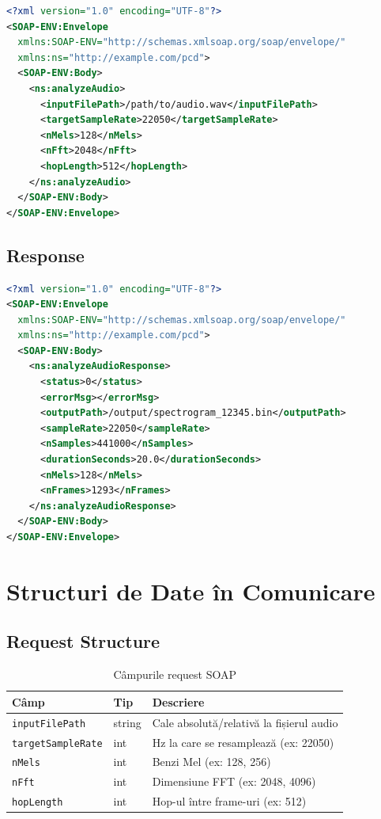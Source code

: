 \documentclass[12pt,a4paper,oneside]{book}
\begin{document}
\begin{lstlisting}[language=xml,caption=Exemplu SOAP Request]
<?xml version="1.0" encoding="UTF-8"?>
<SOAP-ENV:Envelope
  xmlns:SOAP-ENV="http://schemas.xmlsoap.org/soap/envelope/"
  xmlns:ns="http://example.com/pcd">
  <SOAP-ENV:Body>
    <ns:analyzeAudio>
      <inputFilePath>/path/to/audio.wav</inputFilePath>
      <targetSampleRate>22050</targetSampleRate>
      <nMels>128</nMels>
      <nFft>2048</nFft>
      <hopLength>512</hopLength>
    </ns:analyzeAudio>
  </SOAP-ENV:Body>
</SOAP-ENV:Envelope>
\end{lstlisting}

\subsection{Response}

\begin{lstlisting}[language=xml,caption=Exemplu SOAP Response]
<?xml version="1.0" encoding="UTF-8"?>
<SOAP-ENV:Envelope
  xmlns:SOAP-ENV="http://schemas.xmlsoap.org/soap/envelope/"
  xmlns:ns="http://example.com/pcd">
  <SOAP-ENV:Body>
    <ns:analyzeAudioResponse>
      <status>0</status>
      <errorMsg></errorMsg>
      <outputPath>/output/spectrogram_12345.bin</outputPath>
      <sampleRate>22050</sampleRate>
      <nSamples>441000</nSamples>
      <durationSeconds>20.0</durationSeconds>
      <nMels>128</nMels>
      <nFrames>1293</nFrames>
    </ns:analyzeAudioResponse>
  </SOAP-ENV:Body>
</SOAP-ENV:Envelope>
\end{lstlisting}

\section{Structuri de Date în Comunicare}

\subsection{Request Structure}

\begin{table}[H]
\centering
\begin{tabularx}{\textwidth}{|l|l|X|}
\hline
\textbf{Câmp} & \textbf{Tip} & \textbf{Descriere} \\
\hline
\texttt{inputFilePath} & string & Cale absolută/relativă la fișierul audio \\
\hline
\texttt{targetSampleRate} & int & Hz la care se resamplează (ex: 22050) \\
\hline
\texttt{nMels} & int & Benzi Mel (ex: 128, 256) \\
\hline
\texttt{nFft} & int & Dimensiune FFT (ex: 2048, 4096) \\
\hline
\texttt{hopLength} & int & Hop-ul între frame-uri (ex: 512) \\
\hline
\end{tabularx}
\caption{Câmpurile request SOAP}
\end{table}
\end{document}

